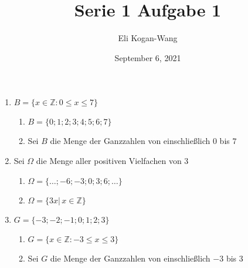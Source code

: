 \documentclass[a4paper,12pt]{article}
\title{Serie 1 Aufgabe 1}
\author{Eli Kogan-Wang}
\date{September 6, 2021}
\begin{document}
\begin{enumerate}[label=(\alph*)]
  \item $B=\{x\in\mathbb{Z}:0\le x\le7\}$
        \begin{enumerate}
          \item $B=\{0;1;2;3;4;5;6;7\}$
          \item Sei $B$ die Menge der Ganzzahlen von einschließlich $0$ bis $7$
        \end{enumerate}
  \item Sei $\Omega$ die Menge aller positiven Vielfachen von $3$
        \begin{enumerate}
          \item $\Omega=\{\dots;-6;-3;0;3;6;\dots\}$
          \item $\Omega=\{3x|\,x\in\mathbb{Z}\}$
        \end{enumerate}
  \item $G=\{−3;−2;−1;0;1;2;3\}$
        \begin{enumerate}
          \item $G=\{x\in\mathbb{Z}:-3\le x\le3\}$
          \item Sei $G$ die Menge der Ganzzahlen von einschließlich $-3$ bis $3$
        \end{enumerate}
\end{enumerate}
\end{document}

